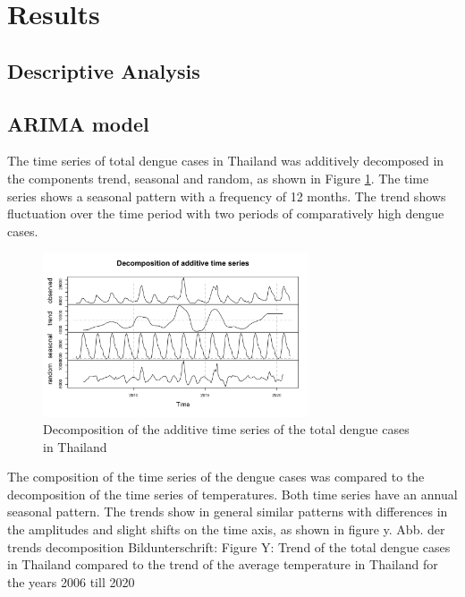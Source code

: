 \section{Results}
	\subsection{Descriptive Analysis}

	\subsection{ARIMA model}
	The time series of total dengue cases in Thailand was additively decomposed in the components trend, seasonal and random, as shown in Figure \ref{fig:decomp_ts_dengue}. The time series shows a seasonal pattern with a frequency of 12 months. The trend shows fluctuation over the time period with two periods of comparatively high dengue cases. 
	
	\begin{figure}[htbp] 
		\centering
		\includegraphics[width=0.7\textwidth]{fig/Decomposition_of_add_ts.png}
		\caption{ Decomposition of the additive time series of the total dengue cases in Thailand}
		\label{fig:decomp_ts_dengue}
	\end{figure}
	
	The composition of the time series of the dengue cases was compared to the decomposition of the time series of temperatures. Both time series have an annual seasonal pattern. The trends show in general similar patterns with differences in the amplitudes and slight shifts on the time axis, as shown in figure y.
	Abb. der trends decomposition
	Bildunterschrift: Figure Y: Trend of the total dengue cases in Thailand compared to the trend of the average temperature in Thailand for the years 2006 till 2020
	